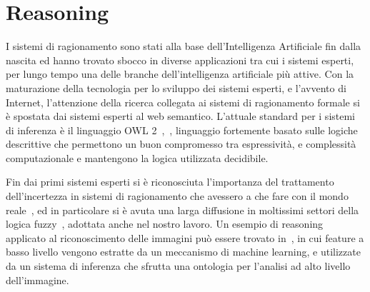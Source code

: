 
\section{Reasoning}

I sistemi di ragionamento sono stati alla base dell'Intelligenza Artificiale fin dalla nascita ed hanno trovato sbocco in diverse applicazioni tra cui i sistemi esperti, per lungo tempo una delle branche dell'intelligenza artificiale più attive.
Con la maturazione della tecnologia per lo sviluppo dei sistemi esperti, e l'avvento di Internet, l'attenzione della ricerca collegata ai sistemi di ragionamento formale si è spostata dai sistemi esperti al web semantico.
L'attuale standard %
per i sistemi di inferenza è il linguaggio OWL 2~\cite{owl2-overview},~\cite{owl2-primer}, linguaggio fortemente basato sulle logiche descrittive che permettono un buon compromesso tra espressività, e complessità computazionale e mantengono la logica utilizzata decidibile.

Fin dai primi sistemi esperti si \`e riconosciuta l'importanza del trattamento dell'incertezza in sistemi di ragionamento che avessero a che fare con il mondo reale~\cite{davis1977production}, ed in particolare si \`e avuta una larga diffusione  in moltissimi settori della logica fuzzy~\cite{}, adottata anche nel nostro lavoro.
Un esempio di reasoning applicato al riconoscimento delle immagini può essere trovato in~\cite{DBLP:journals/ivc/MaillotT08}, in cui feature a basso livello vengono estratte da un meccanismo di machine learning, e utilizzate da un sistema di inferenza che sfrutta una ontologia per l'analisi ad alto livello dell'immagine.


